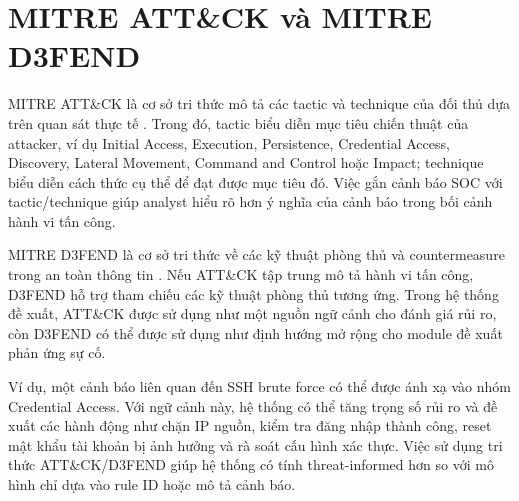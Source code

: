 \documentclass[a4paper,12pt,oneside]{book}
\begin{document}
\section{MITRE ATT\&CK và MITRE D3FEND}
{\fontsize{13pt}{15.6pt}\selectfont

MITRE ATT\&CK là cơ sở tri thức mô tả các tactic và technique của đối thủ dựa trên quan sát thực tế \cite{mitreAttack}. Trong đó, tactic biểu diễn mục tiêu chiến thuật của attacker, ví dụ Initial Access, Execution, Persistence, Credential Access, Discovery, Lateral Movement, Command and Control hoặc Impact; technique biểu diễn cách thức cụ thể để đạt được mục tiêu đó. Việc gắn cảnh báo SOC với tactic/technique giúp analyst hiểu rõ hơn ý nghĩa của cảnh báo trong bối cảnh hành vi tấn công.

\noindent MITRE D3FEND là cơ sở tri thức về các kỹ thuật phòng thủ và countermeasure trong an toàn thông tin \cite{mitreD3FEND,kaloroumakis2021d3fend}. Nếu ATT\&CK tập trung mô tả hành vi tấn công, D3FEND hỗ trợ tham chiếu các kỹ thuật phòng thủ tương ứng. Trong hệ thống đề xuất, ATT\&CK được sử dụng như một nguồn ngữ cảnh cho đánh giá rủi ro, còn D3FEND có thể được sử dụng như định hướng mở rộng cho module đề xuất phản ứng sự cố.

\noindent Ví dụ, một cảnh báo liên quan đến SSH brute force có thể được ánh xạ vào nhóm Credential Access. Với ngữ cảnh này, hệ thống có thể tăng trọng số rủi ro và đề xuất các hành động như chặn IP nguồn, kiểm tra đăng nhập thành công, reset mật khẩu tài khoản bị ảnh hưởng và rà soát cấu hình xác thực. Việc sử dụng tri thức ATT\&CK/D3FEND giúp hệ thống có tính threat-informed hơn so với mô hình chỉ dựa vào rule ID hoặc mô tả cảnh báo.

}
\end{document}

